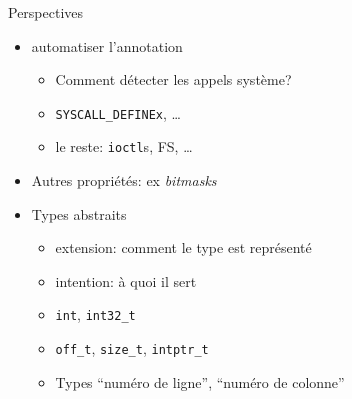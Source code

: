 \begin{frame}{Perspectives}
    \begin{itemize}
        \item automatiser l'annotation
            \begin{itemize}
                \item Comment détecter les appels système?
                \item \texttt{SYSCALL\_DEFINEx}, …
                \item le reste: \texttt{ioctl}s, FS, …
            \end{itemize}
        \item Autres propriétés: ex \emph{bitmasks}
        \item Types abstraits
            \begin{itemize}
                \item extension: comment le type est représenté
                \item intention: à quoi il sert
                \item \texttt{int}, \texttt{int32\_t}
                \item \texttt{off\_t}, \texttt{size\_t}, \texttt{intptr\_t}
                \item Types \enquote{numéro de ligne}, \enquote{numéro de colonne}
            \end{itemize}
        \end{itemize}
\end{frame}
